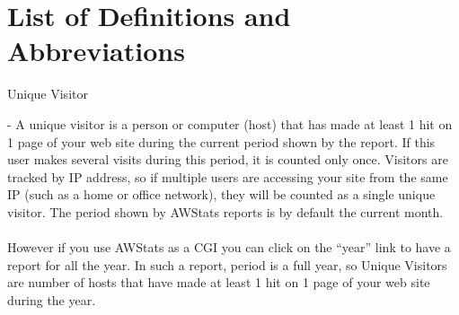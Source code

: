 
\newpage
\setcounter{secnumdepth}{0}
\section{List of Definitions and Abbreviations}
\noindent\begin{itemize*}
  \item{\begin{bf}Unique Visitor\end{bf}} - A unique visitor is a person
or computer (host) that has made at least 1 hit on 1 page of your web
site during the current period shown by the report. If this user makes
several visits during this period, it is counted only once.  Visitors
are tracked by IP address, so if multiple users are accessing your site
 from the same IP (such as a home or office network), they will be 
counted as a single unique visitor. The period shown by AWStats reports
 is by default the current month.\\
\\
However if you use AWStats as a CGI you can click on the ``year'' link to
have a report for all the year. In such a report, period is a full year,
so Unique Visitors are number of hosts that have made at least 1 hit on
1 page of your web site during the year.
\end{itemize*}

